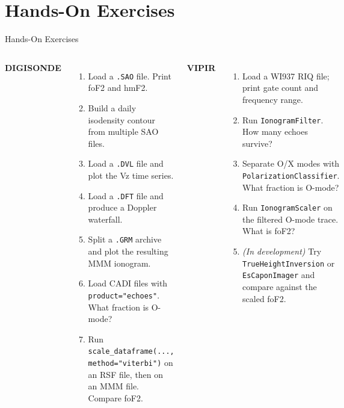 \documentclass[aspectratio=169,11pt]{beamer}
\begin{document}
\section{Hands-On Exercises}

\begin{frame}{Hands-On Exercises}
  \begin{columns}
    \textbf{DIGISONDE}
    \begin{enumerate}\small
      \item Load a \texttt{.SAO} file. Print foF2 and hmF2.
      \item Build a daily isodensity contour from multiple SAO files.
      \item Load a \texttt{.DVL} file and plot the Vz time series.
      \item Load a \texttt{.DFT} file and produce a Doppler waterfall.
      \item Split a \texttt{.GRM} archive and plot the resulting MMM ionogram.
      \item Load CADI files with \texttt{product="echoes"}. What fraction is O-mode?
      \item Run \texttt{scale\_dataframe(..., method="viterbi")} on an RSF file,
            then on an MMM file. Compare foF2.
    \end{enumerate}
    \textbf{VIPIR}
    \begin{enumerate}\small
      \setcounter{enumi}{7}
      \item Load a WI937 RIQ file; print gate count and frequency range.
      \item Run \texttt{IonogramFilter}. How many echoes survive?
      \item Separate O/X modes with \texttt{PolarizationClassifier}. What fraction is O-mode?
      \item Run \texttt{IonogramScaler} on the filtered O-mode trace. What is foF2?
      \item[$\ast$] \textit{(In development)} Try \texttt{TrueHeightInversion} or
            \texttt{EsCaponImager} and compare against the scaled foF2.
    \end{enumerate}
  \end{columns}
\end{frame}

\end{document}
